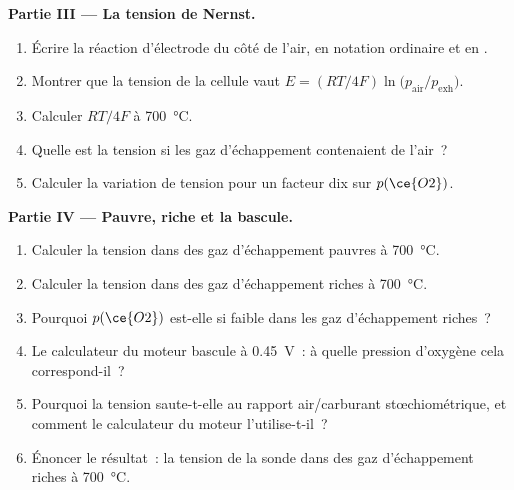 \begin{problem}
\medskip\noindent\textbf{Partie III --- La tension de Nernst.}
\begin{enumerate}[resume]
  \item Écrire la réaction d'électrode du côté de l'air, en notation
        ordinaire et en .
  \item Montrer que la tension de la cellule vaut $E = (RT/4F)\ln\bigl(p_{\mathrm{air}}/p_{\mathrm{exh}}\bigr)$.
  \item Calculer $RT/4F$ à \qty{700}{\celsius}.
  \item Quelle est la tension si les gaz d'échappement contenaient de
        l'air~?
  \item Calculer la variation de tension pour un facteur dix sur $p(\ce{O2})$.
\end{enumerate}

\medskip\noindent\textbf{Partie IV --- Pauvre, riche et la bascule.}
\begin{enumerate}[resume]
  \item Calculer la tension dans des gaz d'échappement pauvres à
        \qty{700}{\celsius}.
  \item Calculer la tension dans des gaz d'échappement riches à
        \qty{700}{\celsius}.
  \item Pourquoi $p(\ce{O2})$ est-elle si faible dans les gaz d'échappement riches~?
  \item Le calculateur du moteur bascule à \qty{0.45}{V}~: à quelle
        pression d'oxygène cela correspond-il~?
  \item Pourquoi la tension saute-t-elle au rapport air/carburant
        stœchiométrique, et comment le calculateur du moteur
        l'utilise-t-il~?
  \item Énoncer le résultat~: la tension de la sonde dans des gaz
        d'échappement riches à \qty{700}{\celsius}.
\end{enumerate}
\end{problem}

